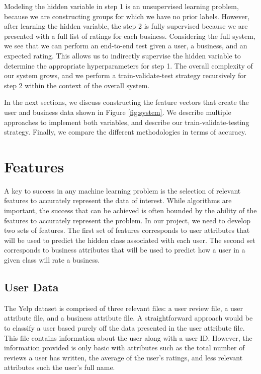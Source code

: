 \documentclass[11pt]{article}
\begin{document}
Modeling the hidden variable in step 1 is an unsupervised learning problem, because we are constructing groups for which we have no prior labels. However, after learning the hidden variable, the step 2 is fully supervised because we are presented with a full list of ratings for each business. Considering the full system, we see that we can perform an end-to-end test given a user, a business, and an expected rating. This allows us to indirectly supervise the hidden variable to determine the appropriate hyperparameters for step 1. The overall complexity of our system grows, and we perform a train-validate-test strategy recursively for step 2 within the context of the overall system.

In the next sections, we discuss constructing the feature vectors that create the user and business data shown in Figure \ref{fig:system}. We describe multiple approaches to implement both variables, and describe our train-validate-testing strategy. Finally, we compare the different methodologies in terms of accuracy.

\section{Features}

A key to success in any machine learning problem is the selection of relevant features to accurately represent the data of interest. While algorithms are important, the success that can be achieved is often bounded by the ability of the features to accurately represent the problem. In our project, we need to develop two sets of features. The first set of features corresponds to user attributes that will be used to predict the hidden class associated with each user. The second set corresponds to business attributes that will be used to predict how a user in a given class will rate a business.

\subsection{User Data}
The Yelp dataset is comprised of three relevant files: a user review file, a user attribute file, and a business attribute file. A straightforward approach would be to classify a user based purely off the data presented in the user attribute file. This file contains information about the user along with a user ID. However, the information provided is only basic with attributes such as the total number of reviews a user has written, the average of the user's ratings, and less relevant attributes such the user's full name.
\end{document}
